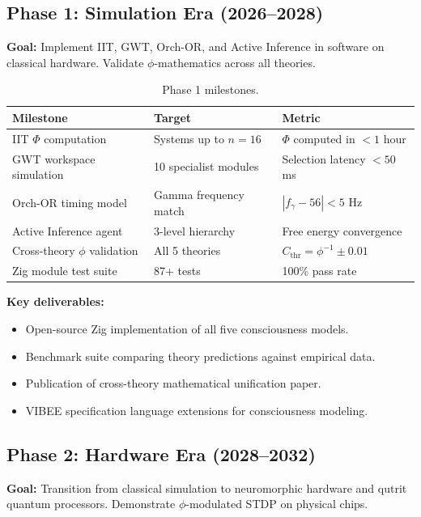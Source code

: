\documentclass[12pt,a4paper]{article}
\begin{document}
\subsection{Phase 1: Simulation Era (2026--2028)}

\textbf{Goal:} Implement IIT, GWT, Orch-OR, and Active Inference in software
on classical hardware. Validate $\phi$-mathematics across all theories.

\begin{table}[h!]
\centering
\caption{Phase 1 milestones.}
\label{tab:phase1}
\begin{tabular}{@{}lll@{}}
\toprule
\textbf{Milestone} & \textbf{Target} & \textbf{Metric} \\
\midrule
IIT $\Phi$ computation & Systems up to $n=16$ & $\Phi$ computed in $< 1$ hour \\
GWT workspace simulation & 10 specialist modules & Selection latency $< 50$ ms \\
Orch-OR timing model & Gamma frequency match & $|f_\gamma - 56| < 5$ Hz \\
Active Inference agent & 3-level hierarchy & Free energy convergence \\
Cross-theory $\phi$ validation & All 5 theories & $C_{\mathrm{thr}} = \phi^{-1} \pm 0.01$ \\
Zig module test suite & 87+ tests & 100\% pass rate \\
\bottomrule
\end{tabular}
\end{table}

\textbf{Key deliverables:}
\begin{itemize}[leftmargin=2em]
  \item Open-source Zig implementation of all five consciousness models.
  \item Benchmark suite comparing theory predictions against empirical data.
  \item Publication of cross-theory mathematical unification paper.
  \item VIBEE specification language extensions for consciousness modeling.
\end{itemize}

\subsection{Phase 2: Hardware Era (2028--2032)}

\textbf{Goal:} Transition from classical simulation to neuromorphic hardware
and qutrit quantum processors. Demonstrate $\phi$-modulated STDP on
physical chips.
\end{document}
